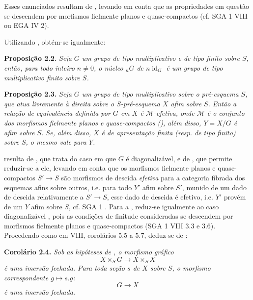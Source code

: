 Esses enunciados resultam de
, levando em conta que
as propriedades em questão se descendem por morfismos fielmente planos
e quase-compactos (cf. SGA 1 VIII ou EGA IV 2).

Utilizando , obtém-se igualmente:

\medskip
\noindent{}\textbf{Proposição 2.2.}
\textit{Seja \(G\) um grupo de tipo multiplicativo e de tipo finito sobre
\(S\), então, para todo inteiro \(n\ne0\), o núcleo \({}_nG\)
de \(n\operatorname{id}_G\) é um grupo de tipo multiplicativo
finito sobre \(S\).}

\medskip
\noindent{}\textbf{Proposição 2.3.}
\textit{Seja \(G\) um grupo de tipo multiplicativo sobre o pré-esquema
\(S\), que atua livremente à direita sobre o \(S\)-pré-esquema
\(X\) afim sobre \(S\). Então
a relação de equivalência
definida por \(G\) em \(X\) é \(\mathcal M\)-efetiva, onde
\(\mathcal M\) é o conjunto dos morfismos fielmente planos e
quase-compactos (), além
disso, \(Y=X/G\) é afim sobre \(S\).
Se, além disso, \(X\)
é de apresentação finita (resp. de tipo finito) sobre \(S\), o mesmo
vale para \(Y\).}

resulta de , que trata do
caso em que \(G\) é diagonalizável, e de
, que permite
reduzir-se a ele, levando em conta que os morfismos fielmente planos
e quase-compactos \(S'\to S\) são morfismos de descida \emph{efetiva}
para a categoria fibrada dos esquemas afins sobre outros, i.e. para
todo \(Y'\) afim sobre \(S'\), munido de um dado de descida
relativamente a \(S'\to S\), esse dado de descida é efetivo, i.e.
\(Y'\) provém de um \(Y\) afim sobre \(S\), cf. SGA 1
. Para a
,
reduz-se igualmente ao caso diagonalizável
, pois as condições de
finitude consideradas se descendem por morfismos fielmente planos e
quase-compactos (SGA 1 VIII 3.3 e 3.6). Procedendo como em VIII,
corolários 5.5 a 5.7, deduz-se de
:

\medskip
\noindent{}\textbf{Corolário 2.4.}
\textit{Sob as hipóteses de
, o morfismo gráfico}
\[
  X\times_S G\longrightarrow X\times_S X
\]
\textit{é uma imersão fechada. Para toda seção \(s\) de \(X\)
sobre \(S\), o morfismo correspondente \(g\mapsto s.g\):}
\[
  G\longrightarrow X
\]
\textit{é uma imersão fechada.}

